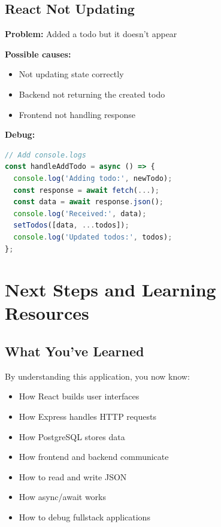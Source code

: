 \documentclass[12pt,a4paper]{article}
\begin{document}
\subsection{React Not Updating}

\textbf{Problem:} Added a todo but it doesn't appear

\textbf{Possible causes:}
\begin{itemize}
    \item Not updating state correctly
    \item Backend not returning the created todo
    \item Frontend not handling response
\end{itemize}

\textbf{Debug:}
\begin{lstlisting}[language=JavaScript]
// Add console.logs
const handleAddTodo = async () => {
  console.log('Adding todo:', newTodo);
  const response = await fetch(...);
  const data = await response.json();
  console.log('Received:', data);
  setTodos([data, ...todos]);
  console.log('Updated todos:', todos);
};
\end{lstlisting}

\section{Next Steps and Learning Resources}

\subsection{What You've Learned}

By understanding this application, you now know:

\begin{itemize}
    \item How React builds user interfaces
    \item How Express handles HTTP requests
    \item How PostgreSQL stores data
    \item How frontend and backend communicate
    \item How to read and write JSON
    \item How async/await works
    \item How to debug fullstack applications
\end{itemize}
\end{document}
